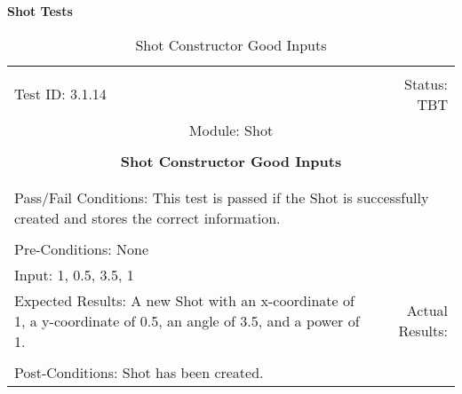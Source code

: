 \documentclass[titlepage]{article}
\begin{document}
\large{\textbf{Shot Tests}}
\begin{center}%
\begin{table}
\begin{tabular}{|l r|}\hline&\\[-2mm]
	Test ID: 3.1.14	&Status: TBT\\[-3mm]
	\multicolumn{2}{|c|}{Module: Shot}\\&\\
	\multicolumn{2}{|c|}{\textbf{\large{Shot Constructor Good Inputs}}}\\&\\\hline&\\[-3mm]
	\multicolumn{2}{|p{\textwidth}|}{Pass/Fail Conditions: This test is passed if the Shot is successfully created and stores the correct information.}\\[1mm]\hline&\\[-3mm]
	\multicolumn{2}{|p{\textwidth}|}{Pre-Conditions: None}\\[4mm]
	\multicolumn{2}{|p{\textwidth}|}{Input: 1, 0.5, 3.5, 1}\\[2mm]\hline
	\multicolumn{1}{|p{0.49\textwidth}}{Expected Results: A new Shot with an x-coordinate of 1, a y-coordinate of 0.5, an angle of 3.5, and a power of 1.}	&\multicolumn{1}{|p{0.45\textwidth}|}{Actual Results: }\\\hline&\\[-3mm]
	\multicolumn{2}{|p{\textwidth}|}{Post-Conditions: Shot has been created.}\\\hline
\end{tabular}
\caption{Shot Constructor Good Inputs}
\end{table}
\end{center}
\end{document}

